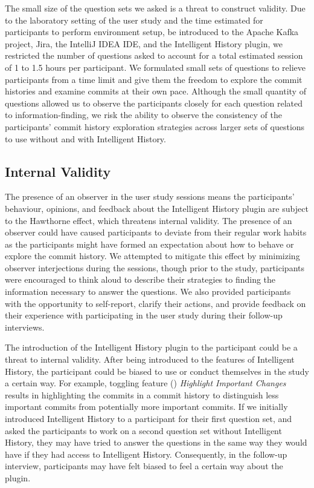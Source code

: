 The small size of the question sets we asked is a threat to construct validity.
Due to the laboratory setting of the user study and the time estimated for participants to perform environment setup,
be introduced to the Apache Kafka project, Jira, the IntelliJ IDEA IDE, and the Intelligent History plugin,
we restricted the number of questions asked to account for a total estimated session of 1 to 1.5 hours per participant.
We formulated small sets of questions to relieve participants from a time limit and give them the freedom to explore the commit histories and examine commits at their own pace.
Although the small quantity of questions allowed us to observe the participants closely for each question related to information-finding,
we risk the ability to observe the consistency of the participants' commit history exploration strategies across larger sets of questions to use without and with Intelligent History.

\subsection{Internal Validity}

The presence of an observer in the user study sessions means the participants' behaviour, opinions, and feedback about the Intelligent History plugin are subject to the Hawthorne effect,
which threatens internal validity.
The presence of an observer could have caused participants to deviate from their regular work habits as the participants might have formed an expectation about how to behave or explore the commit history.
We attempted to mitigate this effect by minimizing observer interjections during the sessions, 
though prior to the study, participants were encouraged to think aloud to describe their strategies to finding the information necessary to answer the questions.
We also provided participants with the opportunity to self-report, clarify their actions, and provide feedback on their experience with participating in the user study during their follow-up interviews.

The introduction of the Intelligent History plugin to the participant could be a threat to internal validity.
After being introduced to the features of Intelligent History, the participant could be biased to use or conduct themselves in the study a certain way.
For example, toggling feature () \textit{Highlight Important Changes} results in highlighting the commits in a commit history to distinguish less important commits from potentially more important commits.
If we initially introduced Intelligent History to a participant for their first question set,
and asked the participants to work on a second question set without Intelligent History,
they may have tried to answer the questions in the same way they would have if they had access to Intelligent History.
Consequently, in the follow-up interview, participants may have felt biased to feel a certain way about the plugin.

